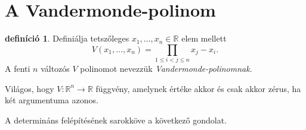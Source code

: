 \documentclass[a4paper, showtrims]{memoir}
\theoremstyle{plain}
\theoremstyle{remark}
\theoremstyle{definition}
\newtheorem{definition}[proposition]{definíció}
\begin{document}
\section{A Vandermonde-polinom}
    
\begin{definition}
    Definiálja tetszőleges $x_1,\ldots,x_n\in\mathbb{R}$ elem mellett
    \[
       V\left( x_1,\ldots,x_n \right)=
       \prod_{1\leq i<j\leq n}x_j-x_i.
    \]
    A fenti $n$ változós $V$ polinomot nevezzük \emph{Vandermonde-polinomnak}.
\end{definition}

Világos, hogy $V:\mathbb{R}^n\to\mathbb{R}$ függvény, amelynek értéke akkor és csak akkor zérus,
ha két argumentuma azonos.

A determináns felépítésének sarokköve a következő gondolat.
\end{document}
